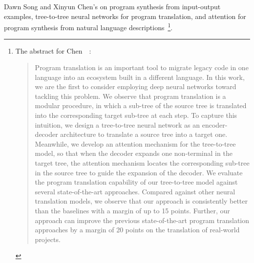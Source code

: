Dawn Song and Xinyun Chen's {} on program synthesis from input-output examples, tree-to-tree neural networks for program translation, and attention for program synthesis from natural language descriptions~\cite{ChenetalICLR-18b}\footnote{%
%
  The abstract for Chen~\etal{}~\cite{ChenetalICLR-18b}:
%
  \begin{quotation}
%
    Program translation is an important tool to migrate legacy code in one language into an ecosystem built in a different language. In this work, we are the first to consider employing deep neural networks toward tackling this problem. We observe that program translation is a modular procedure, in which a sub-tree of the source tree is translated into the corresponding target sub-tree at each step. To capture this intuition, we design a tree-to-tree neural network as an encoder-decoder architecture to translate a source tree into a target one. Meanwhile, we develop an attention mechanism for the tree-to-tree model, so that when the decoder expands one non-terminal in the target tree, the attention mechanism locates the corresponding sub-tree in the source tree to guide the expansion of the decoder. We evaluate the program translation capability of our tree-to-tree model against several state-of-the-art approaches. Compared against other neural translation models, we observe that our approach is consistently better than the baselines with a margin of up to 15 points. Further, our approach can improve the previous state-of-the-art program translation approaches by a margin of 20 points on the translation of real-world projects.
%
  \end{quotation}}.



